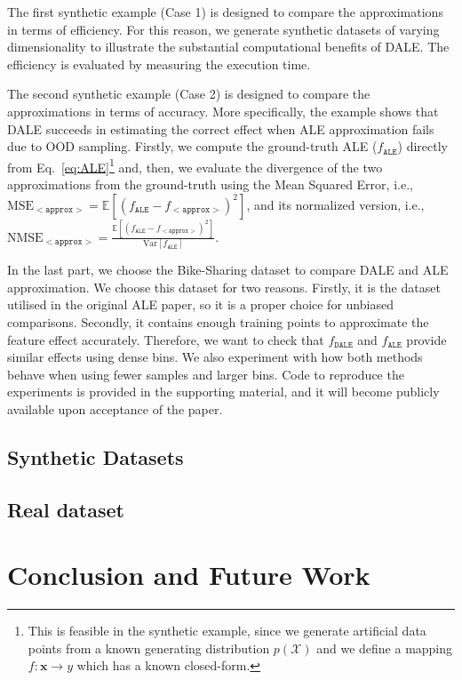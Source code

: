 \documentclass[wcp]{jmlr}
\newcommand{\ale}{f_{\mathtt{ALE}}}
\newcommand{\xb}{\mathbf{x}}
\newcommand{\E}{\mathbb{E}}
\begin{document}
The first synthetic example (Case 1) is designed to compare the
approximations in terms of efficiency. For this reason, we generate
synthetic datasets of varying dimensionality to illustrate the
substantial computational benefits of DALE. The efficiency is
evaluated by measuring the execution time.

The second synthetic example (Case 2) is designed to compare the
approximations in terms of accuracy. More specifically, the example
shows that DALE succeeds in estimating the correct effect when ALE
approximation fails due to OOD sampling. Firstly, we compute the
ground-truth ALE (\(f_{\mathtt{ALE}}\)) directly from
Eq.~\eqref{eq:ALE}\footnote{This is feasible in the synthetic example,
  since we generate artificial data points from a known generating
  distribution \(p(\mathcal{X}) \) and we define a mapping
  \( f: \xb \rightarrow y \) which has a known closed-form.} and,
then, we evaluate the divergence of the two approximations from the
ground-truth using the Mean Squared Error, i.e.,
\(\text{MSE}_{\mathtt{<approx>}} = \E[(\ale -
f_{\mathtt{<approx>}})^2] \), and its normalized version, i.e.,
\(\text{NMSE}_{\mathtt{<approx>}} = \frac{\E[(\ale -
  f_{\mathtt{<approx>}})^2]}{\text{Var}[\ale]}\).

In the last part, we choose the Bike-Sharing dataset to compare DALE
and ALE approximation. We choose this dataset for two
reasons. Firstly, it is the dataset utilised in the original ALE
paper, so it is a proper choice for unbiased comparisons. Secondly, it
contains enough training points to approximate the feature effect
accurately. Therefore, we want to check that \(f_{\mathtt{DALE}}\) and
\(\hat{f}_{\mathtt{ALE}}\) provide similar effects using dense
bins. We also experiment with how both methods behave when using fewer
samples and larger bins. Code to reproduce the experiments is provided
in the supporting material, and it will become publicly available upon
acceptance of the paper.

\subsection{Synthetic Datasets}

\label{sec:5-1-artificial-experiments}

\subsection{Real dataset}

\label{sec:5-2-real-datasets}

\section{Conclusion and Future Work}




%


\end{document}
